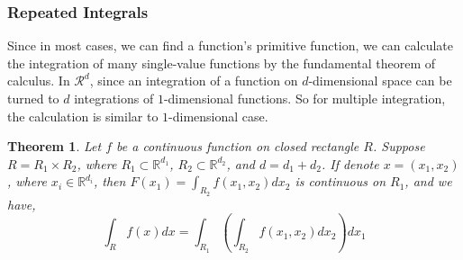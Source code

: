 \documentclass[a4paper]{article}
\newtheorem{theorem}{Theorem}[subsection]
\numberwithin{equation}{subsection}
\begin{document}
\subsubsection{Repeated Integrals}
\par Since in most cases, we can find a function's primitive function, we can calculate the integration of many single-value functions by the fundamental theorem of calculus. In $\mathcal{R}^d$, since an integration of a function on $d$-dimensional space can be turned to $d$ integrations of $1$-dimensional functions. So for multiple integration, the calculation is similar to $1$-dimensional case.

\begin{theorem}
    \label{thm:2}
    Let $f$ be a continuous function on closed rectangle $R$. Suppose $R = R_1 \times R_2$, where $R_1 \subset \mathbb{R}^{d_1}$, $R_2 \subset \mathbb{R}^{d_2}$, and $d = d_1 + d_2$. If denote $x = (x_1, x_2)$, where $x_i \in \mathbb{R}^{d_i}$, then $F(x_1)=\int_{R_2} f(x_1, x_2)dx_2$ is continuous on $R_1$, and we have,
    \begin{equation}
        \int_R f(x)dx = \int_{R_1} ( \int_{R_2} f(x_1, x_2) dx_2 )dx_1
    \end{equation}
\end{theorem}
\end{document}
